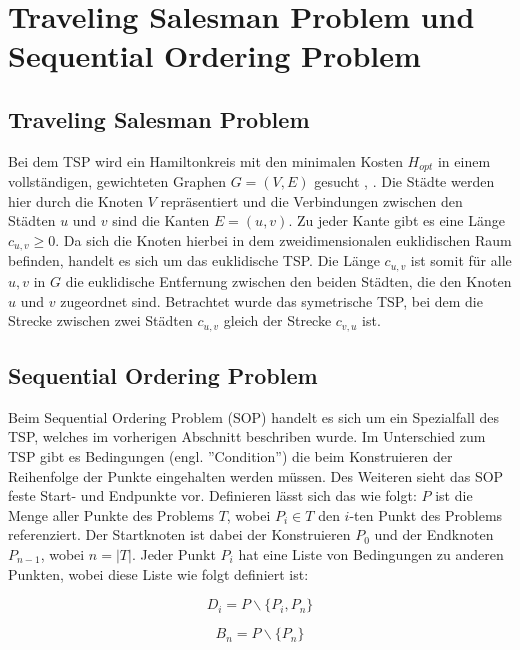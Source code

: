 \documentclass[conference]{IEEEtran}
\begin{document}
  \section{Traveling Salesman Problem und Sequential Ordering Problem}
    \subsection{Traveling Salesman Problem}
      Bei dem TSP wird ein Hamiltonkreis mit den minimalen Kosten $H_{opt}$ in einem vollständigen, 
      gewichteten Graphen $G = (V,E)$ gesucht \cite{b2}, \cite{b3}. Die Städte werden hier durch 
      die Knoten $V$ repräsentiert und die Verbindungen zwischen den Städten $u$ und $v$ sind die 
      Kanten $E = (u,v)$. Zu jeder Kante gibt es eine Länge $c_{u,v} \geq 0$. Da sich die Knoten hierbei 
      in dem zweidimensionalen euklidischen Raum befinden, handelt es sich um das euklidische TSP. 
      Die Länge $c_{u,v}$ ist somit für alle $u,v$ in $G$ die euklidische Entfernung zwischen den beiden Städten, 
      die den Knoten $u$ und $v$ zugeordnet sind. Betrachtet wurde das symetrische TSP, bei dem die Strecke 
      zwischen zwei Städten $c_{u,v}$ gleich der Strecke $c_{v,u}$ ist.


    \subsection{Sequential Ordering Problem}
      Beim Sequential Ordering Problem (SOP) handelt es sich um ein Spezialfall des TSP, welches
      im vorherigen Abschnitt \cite{TSP} beschriben wurde. Im Unterschied zum TSP gibt es Bedingungen
      (engl. ''Condition'') die beim Konstruieren der Reihenfolge der Punkte eingehalten werden
      müssen. Des Weiteren sieht das SOP feste Start- und Endpunkte vor. 
      Definieren lässt sich das wie folgt: $P$ ist die Menge aller Punkte des Problems $T$, wobei 
      $P_i \in T$ den $i$-ten Punkt des Problems referenziert. Der Startknoten ist dabei der Konstruieren
      $P_0$ und der Endknoten $P_{n-1}$, wobei $n = |T|$. Jeder Punkt $P_i$ hat eine Liste
      von Bedingungen zu anderen Punkten, wobei diese Liste wie folgt definiert ist: 

      \begin{equation}
          D_i = P\backslash\{P_i, P_n\}
      \end{equation}

      \begin{equation}
          B_n = P\backslash\{P_n\}
      \end{equation}
\end{document}
